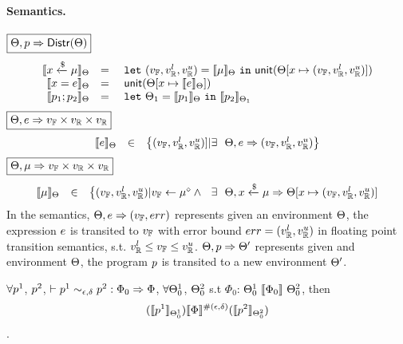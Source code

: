 \documentclass[a4paper,11pt]{article}
\begin{document}
\paragraph{Semantics.}
$\boxed{\Theta, p \Rightarrow \mathsf{Distr}(\Theta)}$
\[
	\begin{array}{rcl}
	\llbracket x \xleftarrow{\$} \mu \rrbracket_{\Theta}
	& = & 
	~\mathtt{let}~ (v_{\mathbb{F}}, v_{\mathbb{R}}^{l}, v_{\mathbb{R}}^{u}) = \llbracket \mu \rrbracket_{\Theta} 
	~\mathtt{in}~ 
	\mathsf{unit}(\Theta[x \mapsto (v_{\mathbb{F}}, v_{\mathbb{R}}^{l}, v_{\mathbb{R}}^{u})])
	\\
	\llbracket x = e \rrbracket_{\Theta}
	& = &  
	~\mathsf{unit}(\Theta[x \mapsto \llbracket e \rrbracket_{\Theta}])
	\\
	\llbracket p_1; p_2 \rrbracket_{\Theta}
	& = &  ~\mathtt{let}~  \Theta_1 = 
	\llbracket p_1 \rrbracket_{\Theta} ~\mathtt{in}~
	\llbracket p_2 \rrbracket_{\Theta_1} 
	\end{array}
\]
$\boxed{\Theta, e \Rightarrow v_{\mathbb{F}} \times v_{\mathbb{R}} \times v_{\mathbb{R}}}$
\[
	\begin{array}{rcl}
	\llbracket e \rrbracket_{\Theta}
	& \in &  
	\big\{(v_{\mathbb{F}}, v_{\mathbb{R}}^{l}, v_{\mathbb{R}}^{u})] |
	\exists ~~  
	\Theta,  
	e \Rightarrow (v_{\mathbb{F}}, v_{\mathbb{R}}^{l}, v_{\mathbb{R}}^{u})\big\}
	\end{array}
\]
$
\boxed{\Theta, \mu \Rightarrow v_{\mathbb{F}} \times v_{\mathbb{R}} \times v_{\mathbb{R}}}
$
\[
	\begin{array}{rcl}
	\llbracket \mu \rrbracket_{\Theta}
	& \in & 
	\big\{
	(v_{\mathbb{F}}, v_{\mathbb{R}}^{l}, v_{\mathbb{R}}^{u}) |
	v_{\mathbb{F}} \leftarrow \mu^{\diamond}
	\land
	~~ \exists ~~  
	\Theta, x \xleftarrow{\$} \mu \Rightarrow \Theta[x \mapsto (v_{\mathbb{F}}, v_{\mathbb{R}}^{l}, v_{\mathbb{R}}^{u})]
	\end{array}
\]
In the semantics, 
$\Theta, e \Rightarrow (v_{\mathbb{F}}, err)$ represents given an environment $\Theta$, the expression $e$
is transited to $v_{\mathbb{F}}$ with error bound $err = (v_{\mathbb{R}}^{l}, v_{\mathbb{R}}^{u})$ in floating point transition semantics, s.t. $v_{\mathbb{R}}^{l} \leq v_{\mathbb{F}} \leq v_{\mathbb{R}}^{u}$. 
$\Theta, p \Rightarrow \Theta'$ represents given and environment $\Theta$, the program $p$ is transited to a new environment $\Theta'$.


\clearpage
\begin{thm}[Soundness]
 $\forall p^1$, $p^2$,  $ \vdash p^1	
\sim_{\epsilon, \delta} 
p^2 :
\Phi_0 \Rightarrow \Phi $,    $\forall \Theta^1_0$, $\Theta^2_0$ 
s.t $\Phi_0$: 
$\Theta^1_0 ~ \llbracket \Phi_0 \rrbracket ~ \Theta^2_0$,
then
$$ 
(\llbracket p^1 \rrbracket_{\Theta^1_0})  
\llbracket \Phi \rrbracket^{\#(\epsilon, \delta)} 
(\llbracket p^2 \rrbracket_{\Theta^2_0}) 
$$.
\end{thm}
\end{document}
